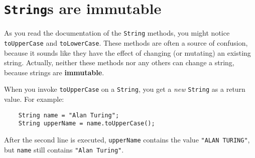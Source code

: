 

%



\section{{\tt String}s are immutable}
\label{immutable}

As you read the documentation of the {\tt String} methods, you
might notice {\tt toUpperCase} and {\tt toLowerCase}.  These
methods are often a source of confusion, because it sounds
like they have the effect of changing (or mutating) an
existing string.  Actually, neither these methods nor any
others can change a string, because strings are {\bf immutable}.

When you invoke {\tt toUpperCase} on a {\tt String}, you get a
{\em new} {\tt String} as a return value.  For example:

\begin{lstlisting}
    String name = "Alan Turing";
    String upperName = name.toUpperCase();
\end{lstlisting}
%
After the second line is executed, {\tt upperName} contains
the value {\tt "ALAN TURING"}, but {\tt name} still contains
{\tt "Alan Turing"}.


